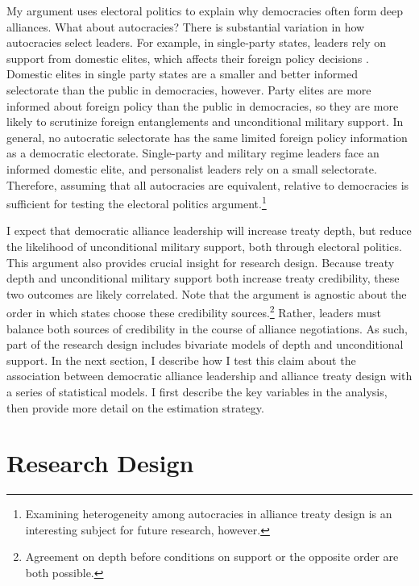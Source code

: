 \documentclass[12pt]{article}
\begin{document}
My argument uses electoral politics to explain why democracies often form deep alliances. 
What about autocracies? 
There is substantial variation in how autocracies select leaders. 
For example, in single-party states, leaders rely on support from domestic elites, which affects their foreign policy decisions \citep{Weeks2014}.
Domestic elites in single party states are a smaller and better informed selectorate than the public in democracies, however.  
Party elites are more informed about foreign policy than the public in democracies, so they are more likely to scrutinize foreign entanglements and unconditional military support. 
In general, no autocratic selectorate has the same limited foreign policy information as a democratic electorate.
Single-party and military regime leaders face an informed domestic elite, and personalist leaders rely on a small selectorate. 
Therefore, assuming that all autocracies are equivalent, relative to democracies is sufficient for testing the electoral politics argument.\footnote{Examining heterogeneity among autocracies in alliance treaty design is an interesting subject for future research, however.} 


I expect that democratic alliance leadership will increase treaty depth, but reduce the likelihood of unconditional military support, both through electoral politics. 
This argument also provides crucial insight for research design. 
Because treaty depth and unconditional military support both increase treaty credibility, these two outcomes are likely correlated.
Note that the argument is agnostic about the order in which states choose these credibility sources.\footnote{Agreement on depth before conditions on support or the opposite order are both possible.}
Rather, leaders must balance both sources of credibility in the course of alliance negotiations. 
As such, part of the research design includes bivariate models of depth and unconditional support. 
In the next section, I describe how I test this claim about the association between democratic alliance leadership and alliance treaty design with a series of statistical models. 
I first describe the key variables in the analysis, then provide more detail on the estimation strategy.


\section{Research Design}
\end{document}
